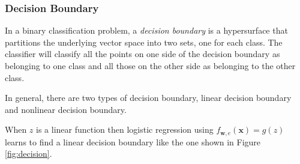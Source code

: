 \documentclass[12pt, twoside]{article}
\begin{document}
\begin{multicols*}{2}
		\subsubsection{Decision Boundary}
		In a binary classification problem, a \textit{decision boundary} is a hypersurface that partitions the underlying vector space into two sets, one for each class. The classifier will classify all the points on one side of the decision boundary as belonging to one class and all those on the other side as belonging to the other class.\cite{enwiki:1152354295}

		In general, there are two types of decision boundary, linear decision boundary and nonlinear decision boundary.
		
		When $z$ is a linear function then logistic regression using $f_{\mathbf{w},e}(\mathbf{x})=g(z)$ learns to find a linear decision boundary like the one shown in Figure \ref{fig:decision}.
		

\end{multicols*}
\end{document}
